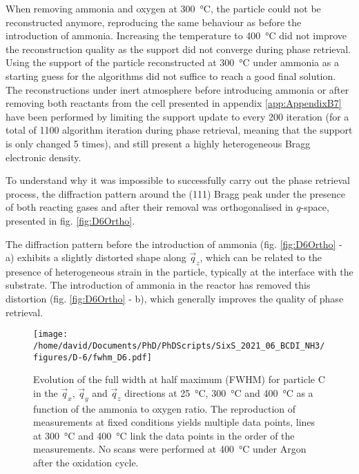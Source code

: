 When removing ammonia and oxygen at \qty{300}{\degreeCelsius}, the particle could not be reconstructed anymore, reproducing the same behaviour as before the introduction of ammonia.
Increasing the temperature to \qty{400}{\degreeCelsius} did not improve the reconstruction quality as the support did not converge during phase retrieval.
Using the support of the particle reconstructed at \qty{300}{\degreeCelsius} under ammonia as a starting guess for the algorithms did not suffice to reach a good final solution.
The reconstructions under inert atmosphere before introducing ammonia or after removing both reactants from the cell presented in appendix \ref{app:AppendixB7} have been performed by limiting the support update to every 200 iteration (for a total of 1100 algorithm iteration during phase retrieval, meaning that the support is only changed 5 times), and still present a highly heterogeneous Bragg electronic density.

To understand why it was impossible to successfully carry out the phase retrieval process, the diffraction pattern around the (111) Bragg peak under the presence of both reacting gases and after their removal was orthogonalised in $q$-space, presented in fig. \ref{fig:D6Ortho}.

The diffraction pattern before the introduction of ammonia (fig. \ref{fig:D6Ortho} - a) exhibits a slightly distorted shape along $\vec{q}_z$, which can be related to the presence of heterogeneous strain in the particle, typically at the interface with the substrate.
The introduction of ammonia in the reactor has removed this distortion (fig. \ref{fig:D6Ortho} - b), which generally improves the quality of phase retrieval.

\begin{figure}[!hbt]
    \centering
    \texttt{[image: /home/david/Documents/PhD/PhDScripts/SixS\_2021\_06\_BCDI\_NH3/figures/D-6/fwhm\_D6.pdf]}
    \caption{
        Evolution of the full width at half maximum (FWHM) for particle C in the $\vec{q}_x$, $\vec{q}_y$ and $\vec{q}_z$ directions at \qty{25}{\degreeCelsius}, \qty{300}{\degreeCelsius} and \qty{400}{\degreeCelsius} as a function of the ammonia to oxygen ratio.
        The reproduction of measurements at fixed conditions yields multiple data points, lines at \qty{300}{\degreeCelsius} and \qty{400}{\degreeCelsius} link the data points in the order of the measurements.
        No scans were performed at \qty{400}{\degreeCelsius} under Argon after the oxidation cycle.
    }
    \label{fig:D6FWHM}
\end{figure}

